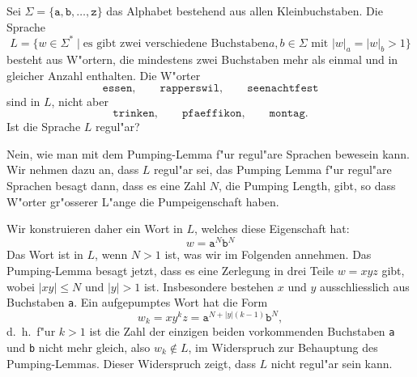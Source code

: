 Sei $\Sigma=\{\texttt{a},\texttt{b},\dots,\texttt{z}\}$ das Alphabet bestehend
aus allen Kleinbuchstaben.
Die Sprache
\[
L=\{w\in\Sigma^*\;|\;\text{es gibt zwei verschiedene Buchstaben
$a,b\in\Sigma$ mit $|w|_a=|w|_b > 1$}\}
\]
besteht aus W"ortern, die mindestens zwei Buchstaben mehr als einmal
und in gleicher Anzahl enthalten.
Die W"orter
\[
\texttt{essen},\qquad
\texttt{rapperswil},\qquad
\texttt{seenachtfest}
\]
sind in $L$, nicht aber
\[
\texttt{trinken},\qquad
\texttt{pfaeffikon},\qquad
\texttt{montag}.
\]
Ist die Sprache $L$ regul"ar?

\begin{loesung}
Nein, wie man mit dem Pumping-Lemma f"ur regul"are Sprachen bewesein kann.
Wir nehmen dazu an, dass $L$ regul"ar sei, das Pumping Lemma f"ur regul"are
Sprachen besagt dann, dass es eine Zahl $N$, die Pumping Length, gibt,
so dass W"orter gr"osserer L"ange die Pumpeigenschaft haben.

Wir konstruieren daher ein Wort in $L$, welches diese Eigenschaft hat:
\[
w=\texttt{a}^N\texttt{b}^N
\]
Das Wort ist in $L$, wenn $N>1$ ist, was wir im Folgenden annehmen.
Das Pumping-Lemma besagt jetzt, dass es eine Zerlegung in drei 
Teile $w=xyz$ gibt, wobei $|xy|\le N$ und $|y|>1$ ist.
Insbesondere bestehen $x$ und $y$ ausschliesslich aus Buchstaben \texttt{a}.
Ein aufgepumptes Wort hat die Form
\[
w_k=xy^kz=\texttt{a}^{N+|y|(k-1)}\texttt{b}^N,
\]
d.~h.~f"ur $k>1$ ist die Zahl der einzigen beiden vorkommenden Buchstaben
\texttt{a} und \texttt{b} nicht mehr gleich, also $w_k\not\in L$,
im Widerspruch zur Behauptung des Pumping-Lemmas.
Dieser Widerspruch zeigt, dass $L$ nicht regul"ar sein kann.
\end{loesung}

